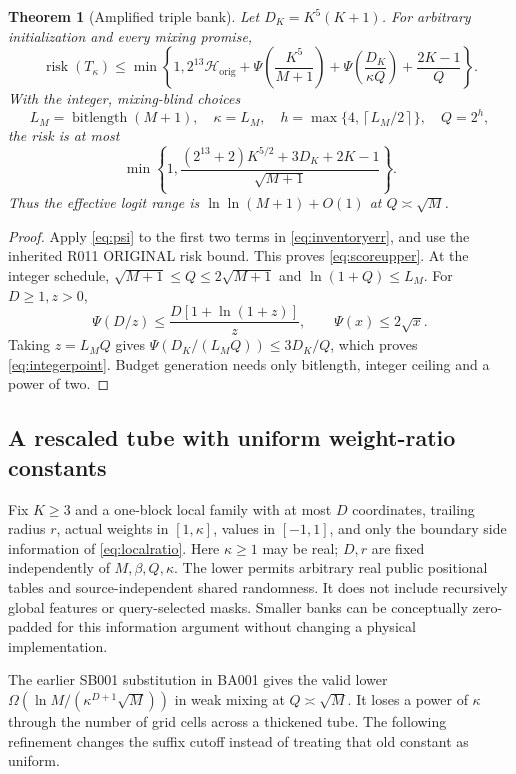\documentclass[11pt,letterpaper]{article}
\newtheorem{theorem}{Theorem}[section]
\theoremstyle{definition}\newtheorem{definition}[theorem]{Definition}
\theoremstyle{remark}\newtheorem{remark}[theorem]{Remark}
\newcommand{\ceil}[1]{\left\lceil #1\right\rceil}
\newcommand{\bl}{\operatorname{bitlength}}
\newcommand{\unit}[1]{\textsf{#1}}
\begin{document}
\begin{theorem}[Amplified triple bank]\label{thm:scoreupper}
Let $D_K=K^5(K+1)$. For arbitrary initialization and every mixing promise,
\begin{equation}\label{eq:scoreupper}
 \operatorname{risk}(T_\kappa)\le\min\left\{1,
 2^{13}\mathcal H_{\mathrm{orig}}+\Psi\left(\frac{K^5}{M+1}\right)
 +\Psi\left(\frac{D_K}{\kappa Q}\right)+\frac{2K-1}{Q}\right\}.
\end{equation}
With the integer, mixing-blind choices
\[
 L_M=\bl(M+1),\quad \kappa=L_M,\quad
 h=\max\{4,\ceil{L_M/2}\},\quad Q=2^h,
\]
the risk is at most
\begin{equation}\label{eq:integerpoint}
 \min\left\{1,\frac{(2^{13}+2)K^{5/2}+3D_K+2K-1}{\sqrt{M+1}}\right\}.
\end{equation}
Thus the effective logit range is $\ln\ln(M+1)+O(1)$ at $Q\asymp\sqrt M$.
\end{theorem}
\begin{proof}
Apply \eqref{eq:psi} to the first two terms in \eqref{eq:inventoryerr}, and use the inherited \unit{R011 ORIGINAL} risk bound. This proves \eqref{eq:scoreupper}. At the integer schedule, $\sqrt{M+1}\le Q\le2\sqrt{M+1}$ and $\ln(1+Q)\le L_M$. For $D\ge1,z>0$,
\[
 \Psi(D/z)\le\frac{D[1+\ln(1+z)]}{z},\qquad \Psi(x)\le2\sqrt x.
\]
Taking $z=L_MQ$ gives $\Psi(D_K/(L_MQ))\le3D_K/Q$, which proves \eqref{eq:integerpoint}. Budget generation needs only bitlength, integer ceiling and a power of two.
\end{proof}

\subsection{A rescaled tube with uniform weight-ratio constants}
Fix $K\ge3$ and a one-block local family with at most $D$ coordinates, trailing radius $r$, actual weights in $[1,\kappa]$, values in $[-1,1]$, and only the boundary side information of \eqref{eq:localratio}. Here $\kappa\ge1$ may be real; $D,r$ are fixed independently of $M,\beta,Q,\kappa$. The lower permits arbitrary real public positional tables and source-independent shared randomness. It does not include recursively global features or query-selected masks. Smaller banks can be conceptually zero-padded for this information argument without changing a physical implementation.

The earlier \unit{SB001} substitution in \unit{BA001} gives the valid lower $\Omega(\ln M/(\kappa^{D+1}\sqrt M))$ in weak mixing at $Q\asymp\sqrt M$. It loses a power of $\kappa$ through the number of grid cells across a thickened tube. The following refinement changes the suffix cutoff instead of treating that old constant as uniform.
\end{document}
